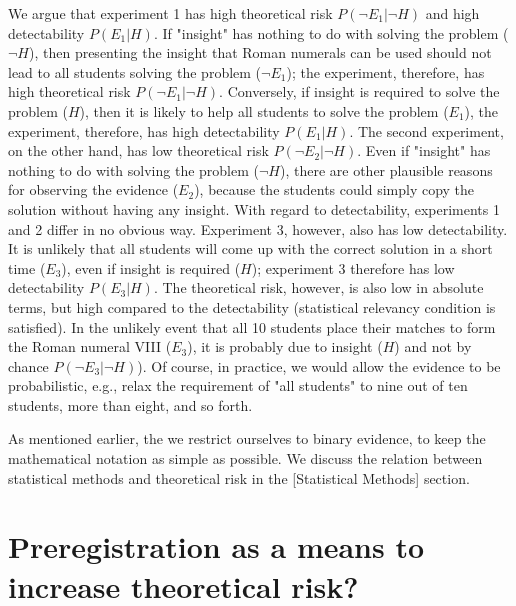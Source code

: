\documentclass[jou,a4paper]{apa7}
\begin{document}
We argue that experiment 1 has high theoretical risk $P(\neg{}E_1|\neg{}H)$ and high detectability $P(E_1|H)$.
If "insight" has nothing to do with solving the problem ($\neg{}H$), then presenting the insight that Roman numerals can be used should not lead to all students solving the problem ($\neg{}E_1$); the experiment, therefore, has high theoretical risk $P(\neg{}E_1|\neg{}H)$.
Conversely, if insight is required to solve the problem ($H$), then it is likely to help all students to solve the problem ($E_1$), the experiment, therefore, has high detectability $P(E_1|H)$.
The second experiment, on the other hand, has low theoretical risk $P(\neg{}E_2|\neg{}H)$.
Even if "insight" has nothing to do with solving the problem ($\neg{}H$), there are other plausible reasons for observing the evidence ($E_2$), because the students could simply copy the solution without having any insight.
With regard to detectability, experiments 1 and 2 differ in no obvious way.
Experiment 3, however, also has low detectability.
It is unlikely that all students will come up with the correct solution in a short time ($E_3$), even if insight is required ($H$); experiment 3 therefore has low detectability $P(E_3|H)$.
The theoretical risk, however, is also low in absolute terms, but high compared to the detectability (statistical relevancy condition is satisfied).
In the unlikely event that all 10 students place their matches to form the Roman numeral VIII ($E_3$), it is probably due to insight ($H$) and not by chance $P(\neg{}E_3|\neg{}H)$).
Of course, in practice, we would allow the evidence to be probabilistic, e.g., relax the requirement of "all students" to nine out of ten students, more than eight, and so forth.\par
As mentioned earlier, the we restrict ourselves to binary evidence, to keep the mathematical notation as simple as possible.
We discuss the relation between statistical methods and theoretical risk in the [Statistical Methods] section. 

\section{Preregistration as a means to increase theoretical risk?}
\end{document}
